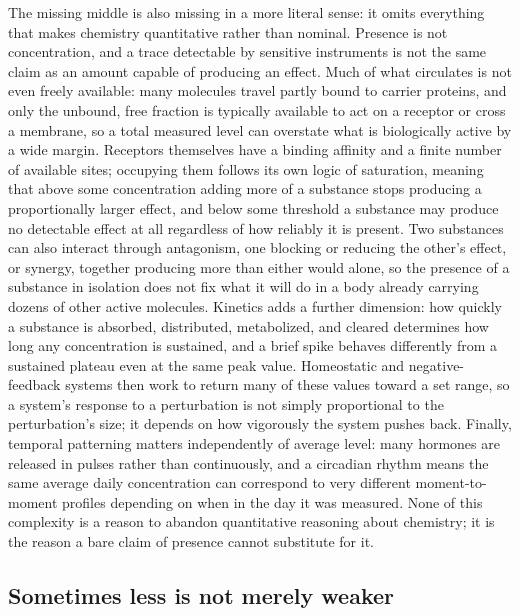 \documentclass[11pt]{article}
\begin{document}
The missing middle is also missing in a more literal sense: it omits everything that makes chemistry quantitative rather than nominal. Presence is not concentration, and a trace detectable by sensitive instruments is not the same claim as an amount capable of producing an effect. Much of what circulates is not even freely available: many molecules travel partly bound to carrier proteins, and only the unbound, free fraction is typically available to act on a receptor or cross a membrane, so a total measured level can overstate what is biologically active by a wide margin. Receptors themselves have a binding affinity and a finite number of available sites; occupying them follows its own logic of saturation, meaning that above some concentration adding more of a substance stops producing a proportionally larger effect, and below some threshold a substance may produce no detectable effect at all regardless of how reliably it is present. Two substances can also interact through antagonism, one blocking or reducing the other's effect, or synergy, together producing more than either would alone, so the presence of a substance in isolation does not fix what it will do in a body already carrying dozens of other active molecules. Kinetics adds a further dimension: how quickly a substance is absorbed, distributed, metabolized, and cleared determines how long any concentration is sustained, and a brief spike behaves differently from a sustained plateau even at the same peak value. Homeostatic and negative-feedback systems then work to return many of these values toward a set range, so a system's response to a perturbation is not simply proportional to the perturbation's size; it depends on how vigorously the system pushes back. Finally, temporal patterning matters independently of average level: many hormones are released in pulses rather than continuously, and a circadian rhythm means the same average daily concentration can correspond to very different moment-to-moment profiles depending on when in the day it was measured. None of this complexity is a reason to abandon quantitative reasoning about chemistry; it is the reason a bare claim of presence cannot substitute for it.

\subsection{Sometimes less is not merely weaker}
\end{document}
